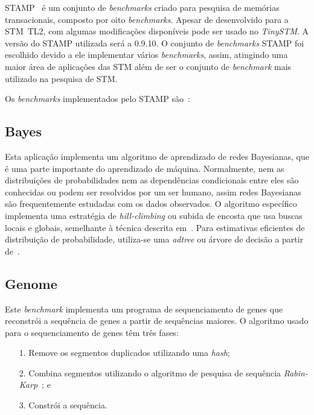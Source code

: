 \documentclass[diss,capa]{texufpel}
\begin{document}
STAMP~\cite{STAMP} é um conjunto de \emph{benchmarks} criado para pesquisa de memórias transacionais, composto por oito \emph{benchmarks}. Apesar de desenvolvido para a STM~TL2, com algumas modificações disponíveis pode ser usado no \emph{TinySTM}.  A versão do STAMP utilizada será a 0.9.10. O conjunto de \emph{benchmarks} STAMP foi escolhido devido a ele implementar vários \emph{benchmarks}, assim, atingindo uma maior área de aplicações das STM além de ser o conjunto de \emph{benchmark} mais utilizado na pesquisa de STM.


Os \emph{benchmarks} implementados pelo STAMP são~\cite{STAMP}:
\newline


\subsection{Bayes}

Esta aplicação implementa um algoritmo de aprendizado de redes Bayesianas, que é uma parte importante do aprendizado de máquina. Normalmente, nem as distribuições de probabilidades nem as dependências condicionais entre eles são conhecidas ou podem ser resolvidos por um ser humano, assim redes Bayesianas são frequentemente estudadas com os dados observados. O algoritmo específico implementa uma estratégia de \emph{hill-climbing} ou subida de encosta que usa buscas locais e globais, semelhante à técnica descrita em~\cite{bayesian}. Para estimativas eficientes de distribuição de probabilidade, utiliza-se uma \emph{adtree} ou árvore de decisão a partir de~\cite{Moore97}.


\subsection{Genome}

Este \emph{benchmark} implementa um programa de sequenciamento de genes que reconstrói a sequência de genes a partir de sequências maiores. O algoritmo usado para o sequenciamento de genes têm  três fases:

\begin{enumerate}
  \item [1.] Remove os segmentos duplicados utilizando uma \emph{hash};
  \item [2.] Combina segmentos utilizando o algoritmo de pesquisa de sequência \emph{Rabin-Karp}~\cite{Karp87}; e
  \item [3.] Constrói a sequência.
  \newline
\end{enumerate}
\end{document}

